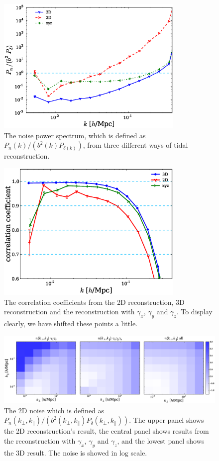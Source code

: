 \documentclass[aps,prd,twocolumn,showpacs,superscriptaddress,groupedaddress,nofootinbib]{revtex4}  %
\begin{document}
\begin{figure}[!htp]
     \centering
     \includegraphics[width=9cm]{1D_noise_bias_all.eps}
     \caption{The noise power spectrum, which is defined as $P_{n}(k)/(b^2(k)P_{\delta(k)})$, from three different ways of tidal reconstruction.}
     \label{1Dnoise}
     \end{figure}

\begin{figure}[h!]
     \centering
     \includegraphics[width=9cm]{1D_correlation_all.eps}
     \caption{The correlation coefficients from the 2D reconstruction, 3D reconstruction and the reconstruction with $\gamma_{x}$, $\gamma_{y}$ and $\gamma_{z}$. To display clearly, we have shifted these points a little.}
     \label{1Dcorrelation_all}
\end{figure}

\begin{figure}[!htp]
     \centering
     \includegraphics[width=18cm]{noise_subfigure.eps}
     \caption{The 2D noise which is defined as $P_{n}(k_\perp, k_\parallel)/(b^2(k_\perp, k_\parallel)P_{\delta}(k_\perp, k_\parallel))$. The upper panel shows the 2D reconstruction's result, the central panel shows results from the reconstruction with $\gamma_{x}$, $\gamma_{y}$ and $\gamma_{z}$, and the lowest panel shows the 3D result. The noise is showed in $\mathrm{log}$ scale.}
     \label{2Dnoise}
     \end{figure}
\end{document}
